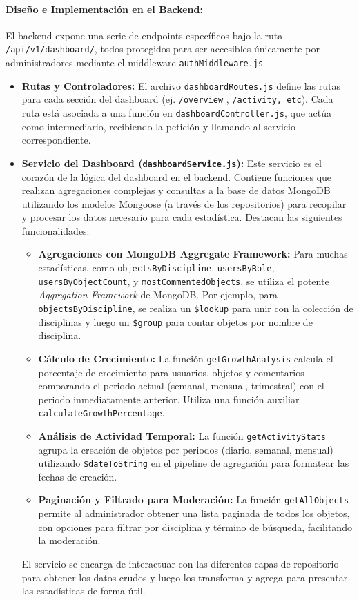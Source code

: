 \paragraph{Diseño e Implementación en el Backend:}El backend expone una serie de endpoints específicos bajo la ruta \texttt{/api/v1/dashboard/}, todos protegidos para ser accesibles únicamente por administradores mediante el middleware \texttt{authMiddleware.js}
\begin{itemize}
    \item \textbf{Rutas y Controladores:} El archivo \texttt{dashboardRoutes.js} define las rutas para cada sección del dashboard (ej. \texttt{/overview} , \texttt{/activity, etc}). Cada ruta está asociada a una función en \texttt{dashboardController.js}, que actúa como intermediario, recibiendo la petición y llamando al servicio correspondiente.
    \item \textbf{Servicio del Dashboard (\texttt{dashboardService.js}):} Este servicio es el corazón de la lógica del dashboard en el backend. Contiene funciones que realizan agregaciones complejas y consultas a la base de datos MongoDB utilizando los modelos Mongoose (a través de los repositorios) para recopilar y procesar los datos necesario para cada estadística. Destacan las siguientes funcionalidades:
    \begin{itemize}
        \item \textbf{Agregaciones con MongoDB Aggregate Framework:} Para muchas estadísticas, como \texttt{objectsByDiscipline}, \texttt{usersByRole}, \texttt{usersByObjectCount}, y \texttt{mostCommentedObjects}, se utiliza el potente \textit{Aggregation Framework} de MongoDB. Por ejemplo, para \texttt{objectsByDiscipline}, se realiza un \texttt{\$lookup} para unir con la colección de disciplinas y luego un \texttt{\$group} para contar objetos por nombre de disciplina.
        \item \textbf{Cálculo de Crecimiento:} La función \texttt{getGrowthAnalysis} calcula el porcentaje de crecimiento para usuarios, objetos y comentarios comparando el periodo actual (semanal, mensual, trimestral) con el periodo inmediatamente anterior. Utiliza una función auxiliar \texttt{calculateGrowthPercentage}.
        \item \textbf{Análisis de Actividad Temporal:} La función \texttt{getActivityStats} agrupa la creación de objetos por periodos (diario, semanal, mensual) utilizando \texttt{\$dateToString} en el pipeline de agregación para formatear las fechas de creación.
        \item \textbf{Paginación y Filtrado para Moderación:} La función \texttt{getAllObjects} permite al administrador obtener una lista paginada de todos los objetos, con opciones para filtrar por disciplina y término de búsqueda, facilitando la moderación.
    \end{itemize}
    El servicio se encarga de interactuar con las diferentes capas de repositorio para obtener los datos crudos y luego los transforma y agrega para presentar las estadísticas de forma útil.
\end{itemize}

